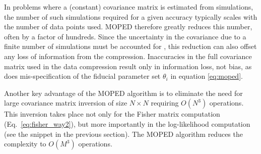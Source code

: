 \documentclass[twocolumn,twocolappendix,nofootinbib,iop]{openjournal}
\newcommand{\FrL}[1]{{\color{cyan}FL: #1}}
\begin{document}
In problems where a (constant) covariance matrix is estimated from simulations, the number of such simulations required for a given accuracy typically scales with the number of data points used. 
MOPED therefore greatly reduces this number, often by a factor of hundreds. Since the uncertainty in the covariance due to a finite number of simulations must be accounted for \citep{2018MNRAS.473.2355S,2007A&A...464..399H}, this reduction can also offset any loss of information from the compression. Inaccuracies in the full covariance matrix used in the data compression result only in information loss, not bias, as does mis-specification of the fiducial parameter set $\theta_i$ in equation \ref{eq:moped}.



Another key advantage of the MOPED algorithm is to eliminate the need for large covariance matrix inversion of size $N\times N$ requiring $O(N^3)$ operations. This inversion takes place not only for the Fisher matrix computation (Eq.~\ref{eq:fisher_way2}), but more importantly in the log-likelihood computation (see the snippet in the previous section). The MOPED algorithm reduces the complexity to $O(M^3)$ operations.
\end{document}
